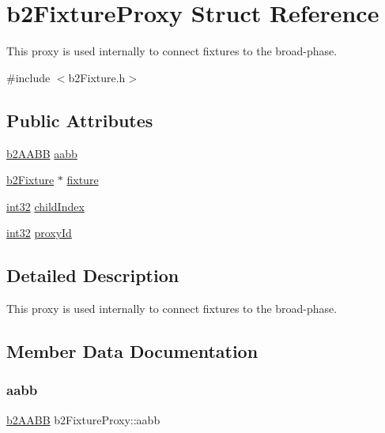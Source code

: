 \hypertarget{structb2_fixture_proxy}{}\section{b2\+Fixture\+Proxy Struct Reference}
\label{structb2_fixture_proxy}


This proxy is used internally to connect fixtures to the broad-\/phase.  




{\ttfamily \#include $<$b2\+Fixture.\+h$>$}

\subsection*{Public Attributes}
\begin{DoxyCompactItemize}
\item 
\mbox{\hyperlink{structb2_a_a_b_b}{b2\+A\+A\+BB}} \mbox{\hyperlink{structb2_fixture_proxy_ad8950f61ce28cfa5b676065d4d843da7}{aabb}}
\item 
\mbox{\hyperlink{classb2_fixture}{b2\+Fixture}} $\ast$ \mbox{\hyperlink{structb2_fixture_proxy_a3a0842dc9699c25658548c2005d0ef62}{fixture}}
\item 
\mbox{\hyperlink{b2_settings_8h_a43d43196463bde49cb067f5c20ab8481}{int32}} \mbox{\hyperlink{structb2_fixture_proxy_a2edb15552cf71f48dacc3608bb134166}{child\+Index}}
\item 
\mbox{\hyperlink{b2_settings_8h_a43d43196463bde49cb067f5c20ab8481}{int32}} \mbox{\hyperlink{structb2_fixture_proxy_aa0ca7e71341368fe6c6913fb39c7283b}{proxy\+Id}}
\end{DoxyCompactItemize}


\subsection{Detailed Description}
This proxy is used internally to connect fixtures to the broad-\/phase. 

\subsection{Member Data Documentation}
\mbox{\label{structb2_fixture_proxy_ad8950f61ce28cfa5b676065d4d843da7}} 
\subsubsection{\texorpdfstring{aabb}{aabb}}
{\footnotesize\ttfamily \mbox{\hyperlink{structb2_a_a_b_b}{b2\+A\+A\+BB}} b2\+Fixture\+Proxy\+::aabb}


